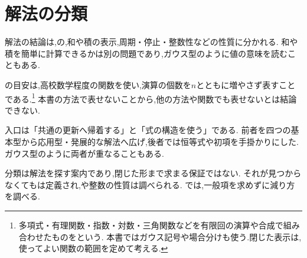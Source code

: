 
\section{解法の分類}\label{節：漸化式の分類}

  解法の結論は,の,和や積の表示,周期・停止・整数性などの性質に分かれる.
  和や積を簡単に計算できるかは別の問題であり,ガウス型のように値の意味を読むこともある.

  の目安は,高校数学程度の関数を使い,演算の個数を$n$とともに増やさず表すことである.\footnote{多項式・有理関数・指数・対数・三角関数などを有限回の演算や合成で組み合わせたものをという.
  本書ではガウス記号や場合分けも使う.閉じた表示は,使ってよい関数の範囲を定めて考える.}
  本書の方法で表せないことから,他の方法や関数でも表せないとは結論できない.

  入口は「共通の更新へ帰着する」と「式の構造を使う」である.
  前者を四つの基本型から応用型・発展的な解法へ広げ,後者では恒等式や初項を手掛かりにした.
  ガウス型のように両者が重なることもある.
  \BookFigClassification

  分類は解法を探す案内であり,閉じた形まで求まる保証ではない.
  それが見つからなくてもは定義され,や整数の性質は調べられる.
  では,一般項を求めずに減り方を調べる.
